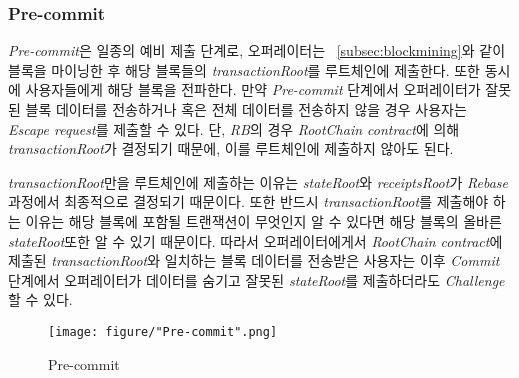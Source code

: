 \documentclass[letterpaper, 11pt]{article}
\begin{document}
\subsubsection{Pre-commit}
\begin{CJK}{UTF8}{mj}
\emph{Pre-commit}은 일종의 예비 제출 단계로, 오퍼레이터는 ~\ref{subsec:blockmining}와 같이 블록을 마이닝한 후 해당 블록들의 \emph{transactionRoot}를 루트체인에 제출한다. 또한 동시에 사용자들에게 해당 블록을 전파한다. 만약 \emph{Pre-commit} 단계에서 오퍼레이터가 잘못된 블록 데이터를 전송하거나 혹은 전체 데이터를 전송하지 않을 경우 사용자는 \emph{Escape request}를 제출할 수 있다. 단, \emph{RB}의 경우 \emph{RootChain contract}에 의해 \emph{transactionRoot}가 결정되기 때문에, 이를 루트체인에 제출하지 않아도 된다.

\emph{transactionRoot}만을 루트체인에 제출하는 이유는 \emph{stateRoot}와 \emph{receiptsRoot}가 \emph{Rebase}과정에서 최종적으로 결정되기 때문이다. 또한 반드시 \emph{transactionRoot}를 제출해야 하는 이유는 해당 블록에 포함될 트랜잭션이 무엇인지 알 수 있다면 해당 블록의 올바른 \emph{stateRoot}또한 알 수 있기 때문이다. 따라서 오퍼레이터에게서 \emph{RootChain contract}에 제출된 \emph{transactionRoot}와 일치하는 블록 데이터를 전송받은 사용자는 이후 \emph{Commit}단계에서 오퍼레이터가 데이터를 숨기고 잘못된 \emph{stateRoot}를 제출하더라도 \emph{Challenge} 할 수 있다.

\begin{figure}[!h]
\centering
\texttt{[image: figure/"Pre-commit".png]}
\caption{Pre-commit}
\label{fig:pre-commit}
\end{figure}

\end{CJK}
\end{document}
